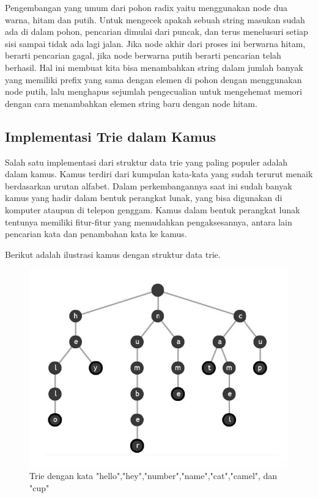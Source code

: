 Pengembangan yang umum dari pohon radix yaitu menggunakan node dua warna, hitam dan putih. Untuk mengecek apakah sebuah string masukan sudah ada di dalam pohon, pencarian dimulai dari puncak, dan terus menelusuri setiap sisi sampai tidak ada lagi jalan. Jika node akhir dari proses ini berwarna hitam, berarti pencarian gagal, jika node berwarna putih berarti pencarian telah berhasil. Hal ini membuat kita bisa menambahkan string dalam jumlah banyak yang memiliki prefix yang sama dengan elemen di pohon dengan menggunakan node putih, lalu menghapus sejumlah pengecualian untuk mengehemat memori dengan cara menambahkan elemen string baru dengan node hitam.

\subsection{Implementasi Trie dalam Kamus}
\label{sec:kamus}

Salah satu implementasi dari struktur data trie yang paling populer adalah dalam kamus. Kamus terdiri dari kumpulan kata-kata yang sudah terurut menaik berdasarkan urutan alfabet. Dalam perkembangannya saat ini sudah banyak kamus yang hadir dalam bentuk perangkat lunak, yang bisa digunakan di komputer ataupun di telepon genggam. Kamus dalam bentuk perangkat lunak tentunya memiliki fitur-fitur yang memudahkan pengaksesannya, antara lain pencarian kata dan penambahan kata ke kamus.

Berikut adalah ilustrasi kamus dengan struktur data trie.

\begin{figure}[H]
\centering
\includegraphics[scale=1.25]{Gambar/contoh-trie-2}
\caption[Trie]{Trie dengan kata "hello","hey","number","name","cat","camel", dan "cup"\cite{najogie:10:trie}} 
\label{contoh-trie-2}
\end{figure}

